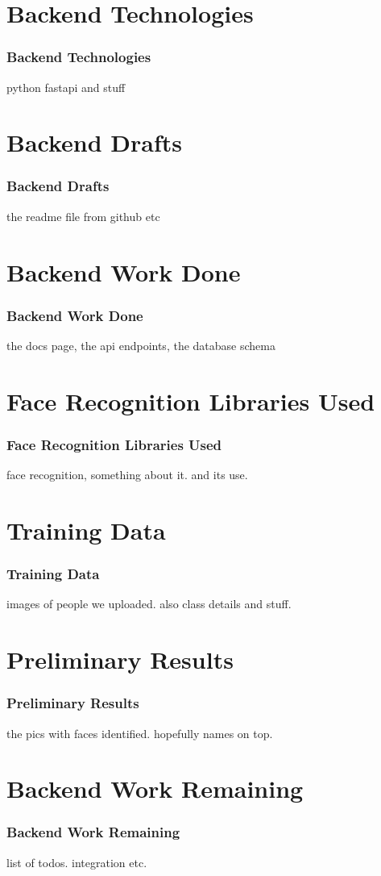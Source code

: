 \documentclass[aspectratio=169]{beamer}
\begin{document}
\section{Backend Technologies}
\begin{frame}
	\centering
	\frametitle{Backend Technologies}
	\begin{minipage}{0.95\textwidth}
		python fastapi and stuff
	\end{minipage}
\end{frame}
\section{Backend Drafts}
\begin{frame}
	\centering
	\frametitle{Backend Drafts}
	\begin{minipage}{0.95\textwidth}
		the readme file from github etc
	\end{minipage}
\end{frame}
\section{Backend Work Done}
\begin{frame}
	\centering
	\frametitle{Backend Work Done}
	\begin{minipage}{0.95\textwidth}
		the docs page, the api endpoints, the database schema
	\end{minipage}
\end{frame}
\section{Face Recognition Libraries Used}
\begin{frame}
	\centering
	\frametitle{Face Recognition Libraries Used}
	\begin{minipage}{0.95\textwidth}
		face recognition, something about it. and its use.
	\end{minipage}
\end{frame}
\section{Training Data}
\begin{frame}
	\centering
	\frametitle{Training Data}
	\begin{minipage}{0.95\textwidth}
		images of people we uploaded. also class details and stuff.
	\end{minipage}
\end{frame}
\section{Preliminary Results}
\begin{frame}
	\centering
	\frametitle{Preliminary Results}
	\begin{minipage}{0.95\textwidth}
		the pics with faces identified. hopefully names on top.
	\end{minipage}
\end{frame}
\section{Backend Work Remaining}
\begin{frame}
	\centering
	\frametitle{Backend Work Remaining}
	\begin{minipage}{0.95\textwidth}
		list of todos. integration etc.
	\end{minipage}
\end{frame}
\end{document}
